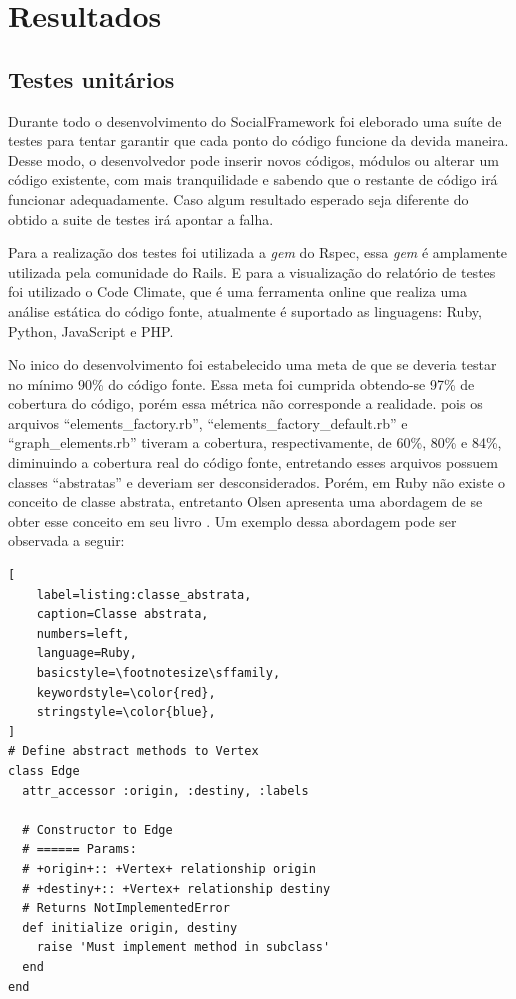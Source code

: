 \chapter{Resultados}
\label{chapter:Resultados}

\section{Testes unitários}

Durante todo o desenvolvimento do SocialFramework foi eleborado uma suíte de testes para tentar garantir que cada ponto do código funcione da devida maneira. Desse modo, o desenvolvedor pode inserir novos códigos, módulos ou alterar um código existente, com mais tranquilidade e sabendo que o restante de código irá funcionar adequadamente. Caso algum resultado esperado seja diferente do obtido a suite de testes irá apontar a falha.

Para a realização dos testes foi utilizada a \textit{gem} do Rspec, essa \textit{gem} é amplamente utilizada pela comunidade do Rails. E para a visualização do relatório de testes foi utilizado o Code Climate, que é uma ferramenta online que realiza uma análise estática do código fonte, atualmente é suportado as linguagens: Ruby, Python, JavaScript e PHP.

No inico do desenvolvimento foi estabelecido uma meta de que se deveria testar no mínimo 90\% do código fonte. Essa meta foi cumprida obtendo-se 97\% de cobertura do código, porém essa métrica não corresponde a realidade. pois os arquivos ``elements\_factory.rb'', ``elements\_factory\_default.rb'' e ``graph\_elements.rb'' tiveram a cobertura, respectivamente, de 60\%, 80\% e 84\%, diminuindo a cobertura real do código fonte, entretando esses arquivos possuem classes ``abstratas'' e deveriam ser desconsiderados. Porém, em Ruby não existe o conceito de classe abstrata, entretanto Olsen apresenta uma abordagem de se obter esse conceito em seu livro \cite{Olsen:2007}. Um exemplo dessa abordagem pode ser observada a seguir:

 \begin{lstlisting}[
    label=listing:classe_abstrata,
    caption=Classe abstrata,
    numbers=left,
    language=Ruby,
    basicstyle=\footnotesize\sffamily,
    keywordstyle=\color{red},
    stringstyle=\color{blue},
]
# Define abstract methods to Vertex
class Edge
  attr_accessor :origin, :destiny, :labels
  
  # Constructor to Edge
  # ====== Params:
  # +origin+:: +Vertex+ relationship origin
  # +destiny+:: +Vertex+ relationship destiny
  # Returns NotImplementedError
  def initialize origin, destiny
    raise 'Must implement method in subclass'
  end
end
\end{lstlisting}


